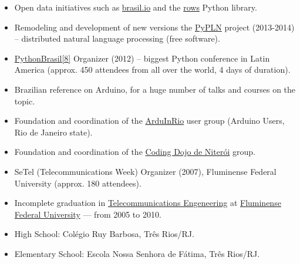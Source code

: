 \documentclass[a4paper,11pt]{article}
\begin{document}
	\begin{itemize}
		\item Open data initiatives such as \href{http://brasil.io/}{brasil.io}
			and the \href{https://github.com/turicas/rows}{rows} Python
			library.
		\item Remodeling and development of new versions the
			\href{http://pypln.org/}{PyPLN} project (2013-2014) -- distributed
			natural language processing (free software).
		\item \href{http://2012.pythonbrasil.org.br/}{PythonBrasil[8]}
			Organizer (2012) -- biggest Python conference in Latin America
			(approx. 450 attendees from all over the world, 4 days of
			duration).
		\item Brazilian reference on Arduino, for a huge number of talks and
			courses on the topic.
		\item Foundation and coordination of the
			\href{https://groups.google.com/forum/#!forum/arduinrio}{ArduInRio}
			user group (Arduino Users, Rio de Janeiro state).
		\item Foundation and coordination of the
			\href{http://dojorio.org}{Coding Dojo de Niterói} group.
		\item SeTel (Telecommunications Week) Organizer (2007), Fluminense
			Federal University (approx. 180 attendees).
	 \end{itemize}


	\begin{itemize}
		\item Incomplete graduation in
			\href{http://telecom.uff.br/}{Telecommunications Engeneering} at
			\href{http://www.uff.br/}{Fluminense Federal University} ---
			from 2005 to 2010.
		\item High School: Colégio Ruy Barbosa, Três Rios/RJ.
		\item Elementary School: Escola Nossa Senhora de Fátima, Três Rios/RJ.
	 \end{itemize}
\end{document}

